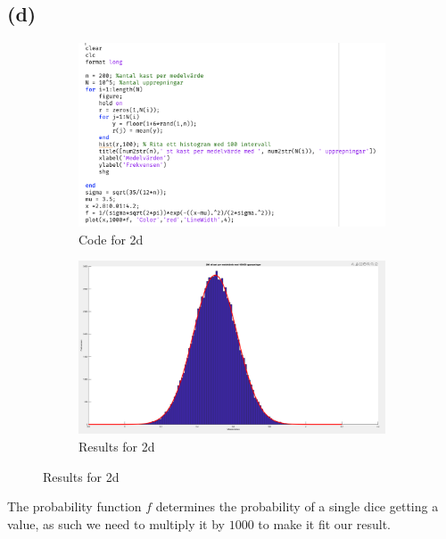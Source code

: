 \documentclass{article}
\begin{document}
\subsection{(d)}
\begin{figure}[H]
    \begin{subfigure}[h]{0.45\linewidth}
        \includegraphics[width=\linewidth]{imgs/q2d_code.png}
        \caption{Code for 2d}
    \end{subfigure}
    \hfill
    \begin{subfigure}[h]{0.45\linewidth}
        \includegraphics[width=\linewidth]{imgs/q2d_graph.png}
        \caption{Results for 2d}
    \end{subfigure}
\end{figure}
The probability function \( f \)  determines the probability of a single dice getting a value, as such we need to multiply it by \( 1000 \) to make it 
fit our result.
\end{document}
